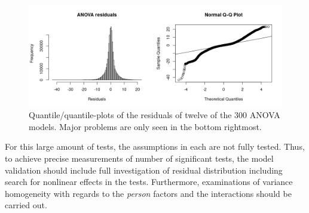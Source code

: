 \documentclass[11pt,fleqn]{article}
\begin{document}
\begin{figure}[H]
	\centering
	\includegraphics[width=.9\textwidth]{qq}
	\caption{Quantile/quantile-plots of the residuals of twelve of the 300 ANOVA models. Major problems are only seen in the bottom rightmost.}\label{fig:qq}
\end{figure}\noindent
For this large amount of tests, the assumptions in each are not fully tested. 
Thus, to achieve precise measurements of number of significant tests, the model validation should include  full investigation of residual distribution including search for nonlinear effects in the tests.
Furthermore, examinations of variance homogeneity with regards to the \textit{person} factors and the interactions should be carried out. 
%
\end{document}

